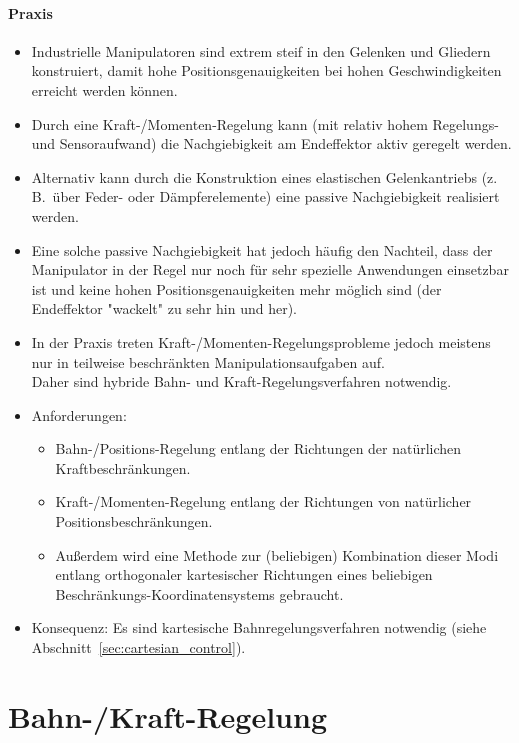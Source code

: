 \documentclass[a4paper, 11pt, accentcolor = tud3b]{tudreport}
\newcommand{\zB}{z.\,B.~}
\begin{document}
			\paragraph{Praxis}
				\begin{itemize}
					\item Industrielle Manipulatoren sind extrem steif in den Gelenken und Gliedern konstruiert, damit hohe Positionsgenauigkeiten bei hohen Geschwindigkeiten erreicht werden können.
					\item Durch eine Kraft-/Momenten-Regelung kann (mit relativ hohem Regelungs- und Sensoraufwand) die Nachgiebigkeit am Endeffektor aktiv geregelt werden.
					\item Alternativ kann durch die Konstruktion eines elastischen Gelenkantriebs (\zB über Feder- oder Dämpferelemente) eine passive Nachgiebigkeit realisiert werden.
					\item Eine solche passive Nachgiebigkeit hat jedoch häufig den Nachteil, dass der Manipulator in der Regel nur noch für sehr spezielle Anwendungen einsetzbar ist und keine hohen Positionsgenauigkeiten mehr möglich sind (der Endeffektor "wackelt" zu sehr hin und her).
					\item In der Praxis treten Kraft-/Momenten-Regelungsprobleme jedoch meistens nur in teilweise beschränkten Manipulationsaufgaben auf. \\ Daher sind hybride Bahn- und Kraft-Regelungsverfahren notwendig.
					\item Anforderungen:
						\begin{itemize}
							\item Bahn-/Positions-Regelung entlang der Richtungen der natürlichen Kraftbeschränkungen.
							\item Kraft-/Momenten-Regelung entlang der Richtungen von natürlicher Positionsbeschränkungen.
							\item Außerdem wird eine Methode zur (beliebigen) Kombination dieser Modi entlang orthogonaler kartesischer Richtungen eines beliebigen Beschränkungs-Koordinatensystems gebraucht.
						\end{itemize}
					\item Konsequenz: Es sind kartesische Bahnregelungsverfahren notwendig (siehe Abschnitt~\ref{sec:cartesian_control}).
				\end{itemize}

		\section{Bahn-/Kraft-Regelung}
\end{document}
